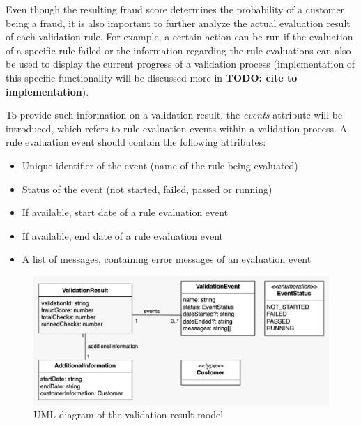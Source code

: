 Even though the resulting fraud score determines the probability of a customer being a fraud, it is also important to further analyze the actual evaluation result of each validation rule. For example, a certain action can be run if the evaluation of a specific rule failed or the information regarding the rule evaluations can also be used to display the current progress of a validation process (implementation of this specific functionality will be discussed more in \textbf{TODO: cite to implementation}). 

To provide such information on a validation result, the \emph{events} attribute will be introduced, which refers to rule evaluation events within a validation process. A rule evaluation event should contain the following attributes:

\begin{itemize}
  \item Unique identifier of the event (name of the rule being evaluated)
  \item Status of the event (not started, failed, passed or running) 
  \item If available, start date of a rule evaluation event 
  \item If available, end date of a rule evaluation event 
  \item A list of messages, containing error messages of an evaluation event
\end{itemize}

\begin{figure}[!ht]
  \includegraphics[width=\textwidth]{diagrams/entity_validation_result.jpeg}
  \caption{UML diagram of the validation result model}
 \end{figure}
 
